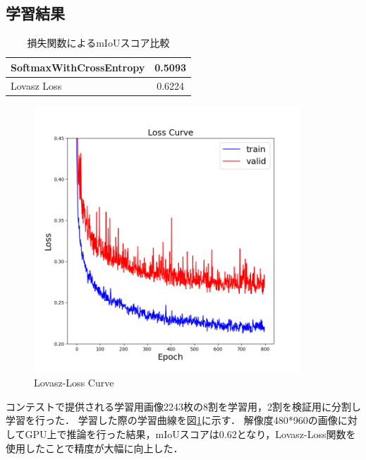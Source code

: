 \subsection{学習結果}
\begin{table}[h]
    \caption{損失関数によるmIoUスコア比較} \vspace{1mm}
    \label{compare_resolution}
    \begin{center}
        \begin{tabular}{lc}
            SoftmaxWithCrossEntropy & 0.5093                     \\ \hline
            Lovasz Loss             & 0.6224
        \end{tabular}
    \end{center}
\end{table}
\begin{figure}[h]
    \begin{center}
        \includegraphics[width=10.0cm]{figures/loss_curve.png}
        \caption{Lovasz-Loss Curve}
        \label{loss_curve}
        \end{center}
\end{figure}
コンテストで提供される学習用画像2243枚の8割を学習用，2割を検証用に分割し学習を行った．
学習した際の学習曲線を図\ref{loss_curve}に示す．
解像度480*960の画像に対してGPU上で推論を行った結果，mIoUスコアは0.62となり，Lovasz-Loss関数を使用したことで精度が大幅に向上した．